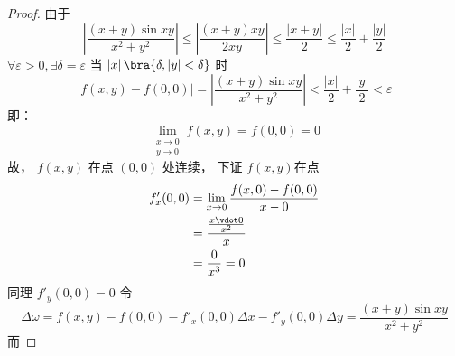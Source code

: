 \begin{proof}
	由于
	\begin{equation*}
		\left| \frac{(x+y) \sin xy }{x^2 + y^2}  \right|
		\leq
		\left| \frac{(x+y) xy}{2 x y}  \right|
		\leq
		\frac{\left| x + y \right|}{2}
		\leq
		\frac{\left| x \right|}{2}
		+
		\frac{\left| y \right|}{2}
	\end{equation*}
	\( \forall \varepsilon > 0 , \exists \delta =  \varepsilon \)  当 \( \left| x \right| \bra{ \delta , \left| y \right| < \delta } \) 时
	\begin{equation*}
		\left| f(x,y) - f(0,0) \right|
		=
		\left| \frac{(x+y) \sin xy }{x^2 + y^2}  \right|
		<
		\frac{\left| x \right|}{2}
		+
		\frac{\left| y \right|}{2}
		<
		\varepsilon
	\end{equation*}
	即：
	\begin{equation}
		\lim_{\substack{ x \to 0 \\ y \to 0 } } f(x,y)
		=
		f(0,0)
		=0
	\end{equation}
	故， \( f(x,y) \) 在点 \( (0,0) \) 处连续， 下证 \( f(x,y) \)在点\(  \)
	\begin{align*}
		f_x'(0,0) & = \lim_{x \to 0} \frac{ f(x,0) - f(0,0) }{ x - 0 } \\
		          & = \frac{ \frac{x \vdot 0}{x^2} }{x}                \\
		          & = \frac{0}{x^3} = 0
	\end{align*}
	同理 \( f'_y(0,0) = 0 \)
	令
	\begin{equation*}
		\Delta \omega = f(x,y) - f(0,0) - f'_x(0,0) \Delta x - f'_y(0,0) \Delta y =  \frac{(x+y) \sin xy }{x^2 + y^2}
	\end{equation*}
	而
\end{proof}
